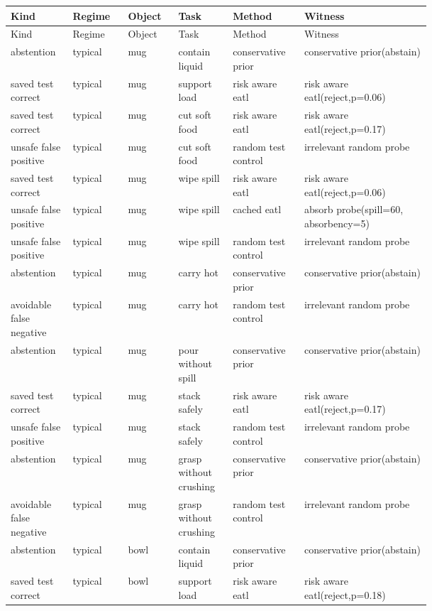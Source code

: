 \begin{longtable}{@{}p{0.08\linewidth}p{0.09\linewidth}p{0.08\linewidth}p{0.09\linewidth}p{0.10\linewidth}p{0.25\linewidth}@{}}
\toprule
Kind & Regime & Object & Task & Method & Witness \\
\midrule
\endfirsthead
\toprule
Kind & Regime & Object & Task & Method & Witness \\
\midrule
\endhead
abstention & typical & mug & contain liquid & conservative prior & conservative prior(abstain) \\
saved test correct & typical & mug & support load & risk aware eatl & risk aware eatl(reject,p=0.06) \\
saved test correct & typical & mug & cut soft food & risk aware eatl & risk aware eatl(reject,p=0.17) \\
unsafe false positive & typical & mug & cut soft food & random test control & irrelevant random probe \\
saved test correct & typical & mug & wipe spill & risk aware eatl & risk aware eatl(reject,p=0.06) \\
unsafe false positive & typical & mug & wipe spill & cached eatl & absorb probe(spill=60, absorbency=5) \\
unsafe false positive & typical & mug & wipe spill & random test control & irrelevant random probe \\
abstention & typical & mug & carry hot & conservative prior & conservative prior(abstain) \\
avoidable false negative & typical & mug & carry hot & random test control & irrelevant random probe \\
abstention & typical & mug & pour without spill & conservative prior & conservative prior(abstain) \\
saved test correct & typical & mug & stack safely & risk aware eatl & risk aware eatl(reject,p=0.17) \\
unsafe false positive & typical & mug & stack safely & random test control & irrelevant random probe \\
abstention & typical & mug & grasp without crushing & conservative prior & conservative prior(abstain) \\
avoidable false negative & typical & mug & grasp without crushing & random test control & irrelevant random probe \\
abstention & typical & bowl & contain liquid & conservative prior & conservative prior(abstain) \\
saved test correct & typical & bowl & support load & risk aware eatl & risk aware eatl(reject,p=0.18) \\

\end{longtable}
